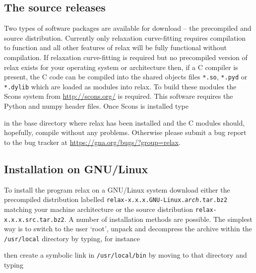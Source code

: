 \subsection{The source releases}
\label{sect: source releases}

Two types of software packages are available for download -- the precompiled and source distribution.  Currently only relaxation curve-fitting requires compilation to function and all other features of relax will be fully functional without compilation.  If relaxation curve-fitting is required but no precompiled version of relax exists for your operating system or architecture then, if a C compiler is present, the C code can be compiled into the shared objects files \texttt{*.so}, \texttt{*.pyd} or \texttt{*.dylib} which are loaded as modules into relax.  To build these modules the Scons system from \href{http://scons.org/}{http://scons.org/} is required.  This software requires the Python and numpy header files.  Once Scons is installed type


in the base directory where relax has been installed and the C modules should, hopefully, compile without any problems.  Otherwise please submit a bug report to the bug tracker at \href{https://gna.org/bugs/?group=relax}{https://gna.org/bugs/?group=relax}.



\subsection{Installation on GNU/Linux}

To install the program relax on a GNU/Linux system download either the precompiled distribution labelled \texttt{relax-x.x.x.GNU-Linux.\textit{arch}.tar.bz2} matching your machine architecture or the source distribution \texttt{relax-x.x.x.src.tar.bz2}.  A number of installation methods are possible.  The simplest way is to switch to the user `root', unpack and decompress the archive within the \texttt{/usr/local} directory by typing, for instance


then create a symbolic link in \texttt{/usr/local/bin} by moving to that directory and typing

